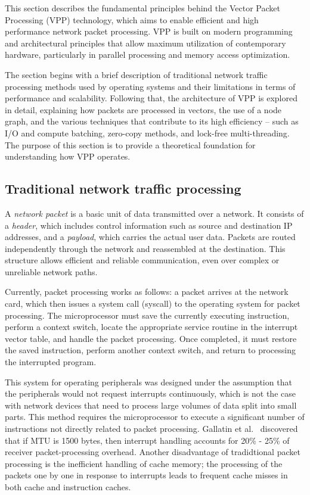 This section describes the fundamental principles behind the Vector Packet Processing (VPP) technology, which aims to enable efficient and high performance network packet processing. 
VPP is built on modern programming and architectural principles that allow maximum utilization of contemporary hardware, particularly in parallel processing and memory access optimization.

The section begins with a brief description of traditional network traffic processing methods used by operating systems and their limitations in terms of performance and scalability. 
Following that, the architecture of VPP is explored in detail, explaining how packets are processed in vectors, the use of a node graph, 
and the various techniques that contribute to its high efficiency -- such as I/O and compute batching, zero-copy methods, and lock-free multi-threading. 
The purpose of this section is to provide a theoretical foundation for understanding how VPP operates.

\subsection{Traditional network traffic processing}
A \textit{network packet} is a basic unit of data transmitted over a network. It consists of a \textit{header}, which includes control information such as source and destination IP addresses, 
and a \textit{payload}, which carries the actual user data. 
Packets are routed independently through the network and reassembled at the destination. 
This structure allows efficient and reliable communication, even over complex or unreliable network paths.

Currently, packet processing works as follows: a packet arrives at the network card, which then
issues a system call (syscall) to the operating system for packet processing. The microprocessor
must save the currently executing instruction, perform a context switch, locate the appropriate
service routine in the interrupt vector table, and handle the packet processing. Once completed, it
must restore the saved instruction, perform another context switch, and return to processing the
interrupted program.

This system for operating peripherals was designed under the assumption that the peripherals
would not request interrupts continuously, which is not the case with network devices that need
to process large volumes of data split into small parts. 
This method requires the microprocessor to execute a significant
number of instructions not directly related to packet processing. 
Gallatin et al.~\cite{gallatin1999trapeze} discovered 
that if MTU is 1500 bytes, then interrupt handling accounts for 20\% - 25\% of receiver packet-processing overhead.
Another disadvantage of tradidtional packet processing is the inefficient handling of cache memory; the processing of the packets one by one in response to
interrupts leads to frequent cache misses in both cache and instruction caches.~\cite{cox2000profiling} 

